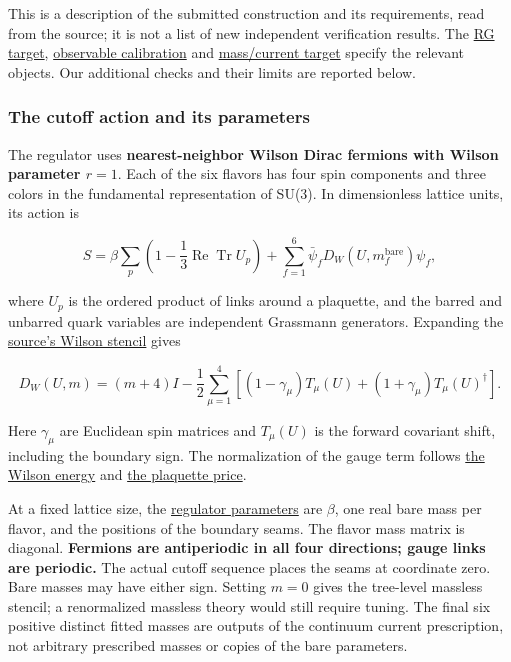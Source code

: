 \documentclass[
  11pt,
]{article}
\begin{document}
This is a description of the submitted construction and its
requirements, read from the source; it is not a list of new independent
verification results. The
\href{https://github.com/yang-mills-group/QCD/blob/main/provenance/supplied-comparator/frozen/reference/YM/Massive/Target/Tower.lean}{RG
target},
\href{https://github.com/yang-mills-group/QCD/blob/main/provenance/supplied-comparator/frozen/reference/YM/Massive/Target/Calibration.lean}{observable
calibration} and
\href{https://github.com/yang-mills-group/QCD/blob/main/provenance/supplied-comparator/frozen/reference/YM/Massive/Target/Physics.lean}{mass/current
target} specify the relevant objects. Our additional checks and their
limits are reported below.

\subsubsection{The cutoff action and its
parameters}\label{the-cutoff-action-and-its-parameters}

The regulator uses \textbf{nearest-neighbor Wilson Dirac fermions with
Wilson parameter \(r=1\)}. Each of the six flavors has four spin
components and three colors in the fundamental representation of SU(3).
In dimensionless lattice units, its action is

\[
S=\beta\sum_p\left(1-\frac13\operatorname{Re}\operatorname{Tr}U_p\right)
  +\sum_{f=1}^{6}\bar\psi_f D_W(U,m_f^{\mathrm{bare}})\psi_f,
\]

where \(U_p\) is the ordered product of links around a plaquette, and
the barred and unbarred quark variables are independent Grassmann
generators. Expanding the
\href{https://github.com/yang-mills-group/QCD/blob/main/provenance/supplied-comparator/frozen/reference/YM/QCD/Lattice/Stencil.lean\#L129}{source's
Wilson stencil} gives

\[
D_W(U,m)=(m+4)I-\frac12\sum_{\mu=1}^{4}
\left[(1-\gamma_\mu)T_\mu(U)+(1+\gamma_\mu)T_\mu(U)^\dagger\right].
\]

Here \(\gamma_\mu\) are Euclidean spin matrices and \(T_\mu(U)\) is the
forward covariant shift, including the boundary sign. The normalization
of the gauge term follows
\href{https://github.com/yang-mills-group/QCD/blob/main/provenance/supplied-comparator/frozen/reference/YM/Wilson/Law.lean\#L29}{the
Wilson energy} and
\href{https://github.com/yang-mills-group/QCD/blob/main/provenance/supplied-comparator/frozen/reference/YM/Gauge/MatrixGroup.lean\#L119}{the
plaquette price}.

At a fixed lattice size, the
\href{https://github.com/yang-mills-group/QCD/blob/main/provenance/supplied-comparator/frozen/reference/YM/Massive/Finite/Core.lean\#L27}{regulator
parameters} are \(\beta\), one real bare mass per flavor, and the
positions of the boundary seams. The flavor mass matrix is diagonal.
\textbf{Fermions are antiperiodic in all four directions; gauge links
are periodic.} The actual cutoff sequence places the seams at coordinate
zero. Bare masses may have either sign. Setting \(m=0\) gives the
tree-level massless stencil; a renormalized massless theory would still
require tuning. The final six positive distinct fitted masses are
outputs of the continuum current prescription, not arbitrary prescribed
masses or copies of the bare parameters.
\end{document}
